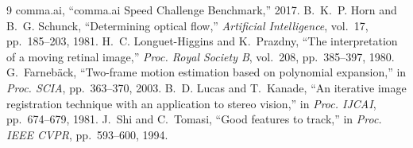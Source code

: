 \documentclass[10pt,twocolumn]{article}
\begin{document}
\begin{thebibliography}{9}
\footnotesize
{} comma.ai, ``comma.ai Speed Challenge Benchmark,'' 2017.
 B.~K.~P. Horn and B.~G. Schunck, ``Determining optical flow,'' \emph{Artificial Intelligence}, vol.~17, pp.~185--203, 1981.
 H.~C. Longuet-Higgins and K.~Prazdny, ``The interpretation of a moving retinal image,'' \emph{Proc. Royal Society B}, vol.~208, pp.~385--397, 1980.
 G.~Farneb\"{a}ck, ``Two-frame motion estimation based on polynomial expansion,'' in \emph{Proc. SCIA}, pp.~363--370, 2003.
 B.~D. Lucas and T.~Kanade, ``An iterative image registration technique with an application to stereo vision,'' in \emph{Proc. IJCAI}, pp.~674--679, 1981.
 J.~Shi and C.~Tomasi, ``Good features to track,'' in \emph{Proc. IEEE CVPR}, pp.~593--600, 1994.
\end{thebibliography}
\end{document}
